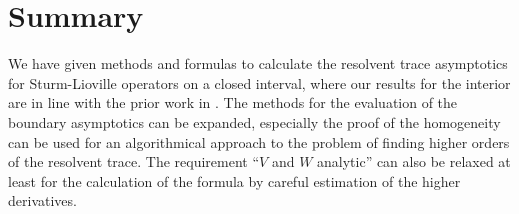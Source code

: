 \section{Summary}
We have given methods and formulas to calculate the resolvent trace asymptotics
for Sturm-Lioville operators on a closed interval, where our results for the
interior are in line with the prior work in \cite{Gel'fand1975}. The methods for
the evaluation of the boundary asymptotics can be expanded, especially the proof
of the homogeneity can be used for an algorithmical approach to the problem of
finding higher orders of the resolvent trace. The requirement ``$V$ and $W$
analytic'' can also be relaxed at least for the calculation of the formula by
careful estimation of the higher derivatives.
